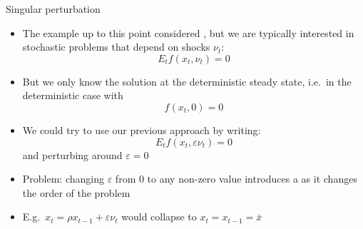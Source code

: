 
\begin{frame}{Singular perturbation}
  \begin{itemize}
    \item The example up to this point considered , but we are typically interested in stochastic problems that depend on shocks $\nu_t$:
          \begin{equation}
            E_t f\left( {{x_t},{\nu _t}} \right) = 0
          \end{equation}
    \item But we only know the solution at the deterministic steady state, i.e.\ in the deterministic case with
          \begin{equation}
            f\left( x_t,0 \right) = 0
          \end{equation}
    \item We could try to use our previous approach by writing:
          \begin{equation}
            E_t f\left( {{x_t},{\varepsilon\nu _t}} \right) = 0
          \end{equation}
          and perturbing around $\varepsilon=0$
    \item Problem: changing $\varepsilon$ from 0 to any non-zero value introduces a  as it changes the order of the problem
    \item E.g.\ $x_t=\rho x_{t-1}+\varepsilon \nu_t$ would collapse to $x_t=x_{t-1}=\bar x$
  \end{itemize}
\end{frame}

